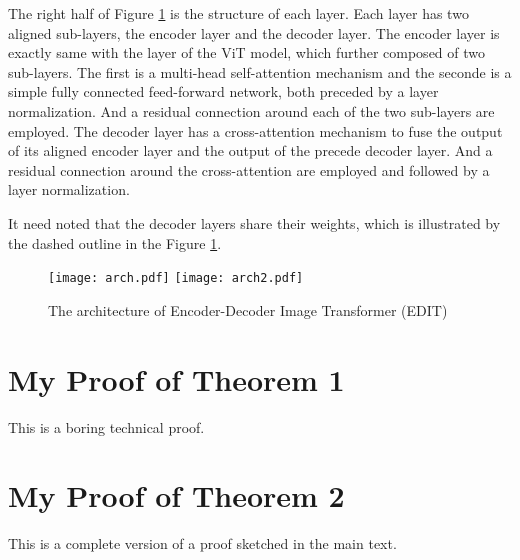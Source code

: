 \documentclass[anon,12pt]{colt2024} %
\begin{document}
The right half of Figure \ref{fig1} is the structure of each layer. Each layer has two aligned sub-layers, the encoder layer and the decoder layer. The encoder layer is exactly same with the layer of the ViT model, which further composed of two sub-layers. The first is a multi-head self-attention mechanism and the seconde is a simple fully connected feed-forward network, both preceded by a layer normalization. And a residual connection around each of the two sub-layers are employed. The decoder layer has a cross-attention mechanism to fuse the output of its aligned encoder layer and the output of the precede decoder layer. And a residual connection around the cross-attention are employed and  followed by a layer normalization. 

It need noted that the decoder layers share their weights, which is illustrated by the dashed outline in the  Figure \ref{fig1}.


\begin{figure}[h]
  \centering
  \texttt{[image: arch.pdf]}
  \texttt{[image: arch2.pdf]}
  \caption{The architecture of Encoder-Decoder Image Transformer (EDIT)}\label{fig1}
\end{figure}
  



\appendix


\section{My Proof of Theorem 1}

This is a boring technical proof.

\section{My Proof of Theorem 2}

This is a complete version of a proof sketched in the main text.
\end{document}
